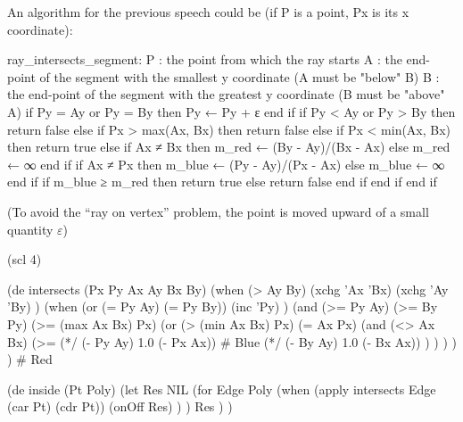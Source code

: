 An algorithm for the previous speech could be (if P is a point, Px is
its x coordinate):

\begin{wideverbatim}
 ray_intersects_segment:
    P : the point from which the ray starts
    A : the end-point of the segment with the smallest y coordinate
        (A must be "below" B)
    B : the end-point of the segment with the greatest y coordinate
        (B must be "above" A)
 if Py = Ay or Py = By then
   Py ← Py + ε
 end if
 if Py < Ay or Py > By then 
   return false
 else if Px > max(Ax, Bx) then 
   return false
 else
   if Px < min(Ax, Bx) then
     return true
   else
     if Ax ≠ Bx then
       m_red ← (By - Ay)/(Bx - Ax)
     else
       m_red ← ∞
     end if
     if Ax ≠ Px then
       m_blue ← (Py - Ay)/(Px - Ax)
     else
       m_blue ← ∞
     end if
     if m_blue ≥ m_red then
       return true
     else
       return false
     end if
   end if
 end if
\end{wideverbatim}

(To avoid the ``ray on vertex'' problem, the point is moved upward of a
small quantity $\varepsilon$)

\begin{wideverbatim}

(scl 4)

(de intersects (Px Py Ax Ay Bx By)
   (when (> Ay By)
      (xchg 'Ax 'Bx)
      (xchg 'Ay 'By) )
   (when (or (= Py Ay) (= Py By))
      (inc 'Py) )
   (and
      (>= Py Ay)
      (>= By Py)
      (>= (max Ax Bx) Px)
      (or
         (> (min Ax Bx) Px)
         (= Ax Px)
         (and
            (<> Ax Bx)
            (>=
               (*/ (- Py Ay) 1.0 (- Px Ax))            # Blue
               (*/ (- By Ay) 1.0 (- Bx Ax)) ) ) ) ) )  # Red

(de inside (Pt Poly)
   (let Res NIL
      (for Edge Poly
         (when (apply intersects Edge (car Pt) (cdr Pt))
            (onOff Res) ) )
      Res ) )

\end{wideverbatim}

